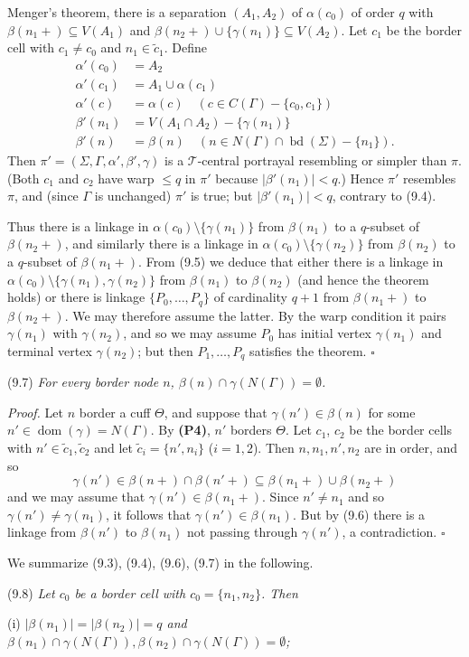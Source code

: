 Menger's theorem, there is a separation $(A_1, A_2)$ of $\alpha(c_0)$ of order $q$ with $\beta(n_1 +) \subseteq V(A_1)$ and $\beta(n_2 +) \cup \{\gamma(n_1)\} \subseteq V(A_2)$. Let $c_1$ be the border cell with $c_1 \ne c_0$ and $n_1 \in \tilde{c}_1$. Define
\begin{align*}
\alpha'(c_0) &= A_2 \\
\alpha'(c_1) &= A_1 \cup \alpha(c_1) \\
\alpha'(c) &= \alpha(c) \quad (c \in C(\Gamma) - \{c_0, c_1\}) \\
\beta'(n_1) &= V(A_1 \cap A_2) - \{\gamma(n_1)\} \\
\beta'(n) &= \beta(n) \quad (n \in N(\Gamma) \cap \operatorname{bd}(\Sigma) - \{n_1\}).
\end{align*}
Then $\pi' = (\Sigma, \Gamma, \alpha', \beta', \gamma)$ is a $\mathcal{T}$-central portrayal resembling or simpler than $\pi$. (Both $c_1$ and $c_2$ have warp $\le q$ in $\pi'$ because $|\beta'(n_1)| < q$.) Hence $\pi'$ resembles $\pi$, and (since $\Gamma$ is unchanged) $\pi'$ is true; but $|\beta'(n_1)| < q$, contrary to (9.4).

Thus there is a linkage in $\alpha(c_0) \setminus \{\gamma(n_1)\}$ from $\beta(n_1)$ to a $q$-subset of $\beta(n_2+)$, and similarly there is a linkage in $\alpha(c_0) \setminus \{\gamma(n_2)\}$ from $\beta(n_2)$ to a $q$-subset of $\beta(n_1+)$. From (9.5) we deduce that either there is a linkage in $\alpha(c_0) \setminus \{\gamma(n_1), \gamma(n_2)\}$ from $\beta(n_1)$ to $\beta(n_2)$ (and hence the theorem holds) or there is linkage $\{P_0, \dots, P_q\}$ of cardinality $q + 1$ from $\beta(n_1+)$ to $\beta(n_2+)$. We may therefore assume the latter. By the warp condition it pairs $\gamma(n_1)$ with $\gamma(n_2)$, and so we may assume $P_0$ has initial vertex $\gamma(n_1)$ and terminal vertex $\gamma(n_2)$; but then $P_1, \dots, P_q$ satisfies the theorem. $\square$

\stmt
(9.7) \textit{For every border node $n$, $\beta(n) \cap \gamma(N(\Gamma)) = \emptyset$.}

\textit{Proof.} Let $n$ border a cuff $\Theta$, and suppose that $\gamma(n') \in \beta(n)$ for some $n' \in \operatorname{dom}(\gamma) = N(\Gamma)$. By \textbf{(P4)}, $n'$ borders $\Theta$. Let $c_1$, $c_2$ be the border cells with $n' \in \tilde{c}_1, \tilde{c}_2$ and let $\tilde{c}_i = \{n', n_i\}$ ($i = 1, 2$). Then $n, n_1, n', n_2$ are in order, and so
\begin{equation*}
\gamma(n') \in \beta(n+) \cap \beta(n'+) \subseteq \beta(n_1+) \cup \beta(n_2+)
\end{equation*}
and we may assume that $\gamma(n') \in \beta(n_1+)$. Since $n' \ne n_1$ and so $\gamma(n') \ne \gamma(n_1)$, it follows that $\gamma(n') \in \beta(n_1)$. But by (9.6) there is a linkage from $\beta(n')$ to $\beta(n_1)$ not passing through $\gamma(n')$, a contradiction. $\square$

We summarize (9.3), (9.4), (9.6), (9.7) in the following.

\stmt
(9.8) \textit{Let $c_0$ be a border cell with $c_0 = \{n_1, n_2\}$. Then}

\hspace*{12pt}(i) \textit{$|\beta(n_1)| = |\beta(n_2)| = q$ and $\beta(n_1) \cap \gamma(N(\Gamma)), \beta(n_2) \cap \gamma(N(\Gamma)) = \emptyset$;}
